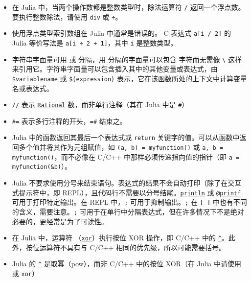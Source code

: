 \begin{itemize}
\item 在 Julia 中，当两个操作数都是整数类型时，除法运算符 \texttt{/} 返回一个浮点数。 要执行整数除法，请使用 \texttt{div} 或 \texttt{÷}。


\item 使用浮点类型索引数组在 Julia 中通常是错误的。 C 表达式 \texttt{a[i / 2]} 的 Julia 等价写法是 \texttt{a[i ÷ 2 + 1]}，其中 \texttt{i} 是整数类型。


\item 字符串字面量可用 \texttt{{\textquotedbl}} 或 \texttt{{\textquotedbl}{\textquotedbl}{\textquotedbl}} 分隔，用 \texttt{{\textquotedbl}{\textquotedbl}{\textquotedbl}} 分隔的字面量可以包含 \texttt{{\textquotedbl}} 字符而无需像 \texttt{{\textquotedbl}{\textbackslash}{\textquotedbl}{\textquotedbl}} 这样来引用它。字符串字面量可以包含插入其中的其他变量或表达式，由 \texttt{\$variablename} 或 \texttt{\$(expression)} 表示，它在该函数所处的上下文中计算变量名或表达式。


\item \texttt{//} 表示 \hyperlink{8304566144531167610}{\texttt{Rational}} 数，而非单行注释（其在 Julia 中是 \texttt{\#}）


\item \texttt{\#=} 表示多行注释的开头，\texttt{=\#} 结束之。


\item Julia 中的函数返回其最后一个表达式或 \texttt{return} 关键字的值。可以从函数中返回多个值并将其作为元组赋值，如 \texttt{(a, b) = myfunction()} 或 \texttt{a, b = myfunction()}，而不必像在 C/C++ 中那样必须传递指向值的指针（即 \texttt{a = myfunction(\&b)}）。


\item Julia 不要求使用分号来结束语句。表达式的结果不会自动打印（除了在交互式提示符中，即 REPL），且代码行不需要以分号结尾。\hyperlink{783803254548423222}{\texttt{println}} 或 \hyperlink{13954719910189591998}{\texttt{@printf}} 可用于打印特定输出。在 REPL 中，\texttt{;} 可用于抑制输出。\texttt{;} 在 \texttt{[ ]} 中也有不同的含义，需要注意。\texttt{;} 可用于在单行中分隔表达式，但在许多情况下不是绝对必要的，更经常是为了可读性。


\item 在 Julia 中，运算符 \hyperlink{7071880015536674935}{\texttt{\unicodeveebar{}}}（\hyperlink{7071880015536674935}{\texttt{xor}}）执行按位 XOR 操作，即 C/C++ 中的 \hyperlink{3804132060389001711}{\texttt{{\textasciicircum}}}。此外，按位运算符不具有与 C/C++ 相同的优先级，所以可能需要括号。


\item Julia 的 \hyperlink{3804132060389001711}{\texttt{{\textasciicircum}}} 是取幂（pow），而非 C/C++ 中的按位 XOR（在 Julia 中请使用 \hyperlink{7071880015536674935}{\texttt{\unicodeveebar{}}} 或 \texttt{xor}）



\end{itemize}

